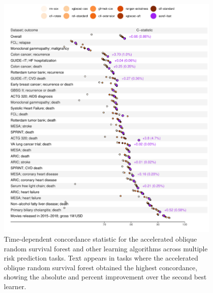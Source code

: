 \documentclass[twoside,11pt]{article}\usepackage[]{graphicx}\usepackage[]{xcolor}
\makeatletter
\def\maxwidth{ %
  \ifdim\Gin@nat@width>\linewidth
    \linewidth
  \else
    \Gin@nat@width
  \fi
}
\newenvironment{knitrout}{}{} %
\makeatother
\begin{document}
\begin{knitrout}
\color{fgcolor}\begin{figure}
\includegraphics[width=\maxwidth]{figure/bm_pred_viz_cstat-1} \caption[Time-dependent concordance statistic for the accelerated oblique random survival forest and other learning algorithms across multiple risk prediction tasks]{Time-dependent concordance statistic for the accelerated oblique random survival forest and other learning algorithms across multiple risk prediction tasks. Text appears in tasks where the accelerated oblique random survival forest obtained the highest concordance, showing the absolute and percent improvement over the second best learner.}\label{fig:bm_pred_viz_cstat}
\end{figure}

\end{knitrout}
\end{document}
